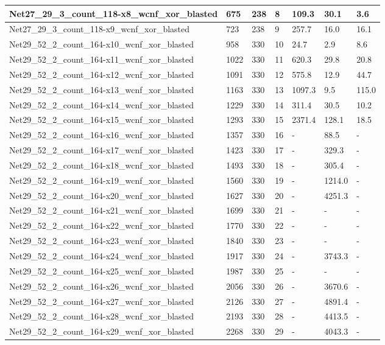 \begin{scriptsize}
\begin{longtable}{|p{5cm}|l|l|l|l|l|l|}
Net27\_29\_3\_count\_118-x8\_wcnf\_xor\_blasted&675&238&8&109.3&30.1&3.6 \\ \hline 
Net27\_29\_3\_count\_118-x9\_wcnf\_xor\_blasted&723&238&9&257.7&16.0&16.1 \\ \hline 
Net29\_52\_2\_count\_164-x10\_wcnf\_xor\_blasted&958&330&10&24.7&2.9&8.6 \\ \hline 
Net29\_52\_2\_count\_164-x11\_wcnf\_xor\_blasted&1022&330&11&620.3&29.8&20.8 \\ \hline 
Net29\_52\_2\_count\_164-x12\_wcnf\_xor\_blasted&1091&330&12&575.8&12.9&44.7 \\ \hline 
Net29\_52\_2\_count\_164-x13\_wcnf\_xor\_blasted&1163&330&13&1097.3&9.5&115.0 \\ \hline 
Net29\_52\_2\_count\_164-x14\_wcnf\_xor\_blasted&1229&330&14&311.4&30.5&10.2 \\ \hline 
Net29\_52\_2\_count\_164-x15\_wcnf\_xor\_blasted&1293&330&15&2371.4&128.1&18.5 \\ \hline 
Net29\_52\_2\_count\_164-x16\_wcnf\_xor\_blasted&1357&330&16&-&88.5&- \\ \hline 
Net29\_52\_2\_count\_164-x17\_wcnf\_xor\_blasted&1423&330&17&-&329.3&- \\ \hline 
Net29\_52\_2\_count\_164-x18\_wcnf\_xor\_blasted&1493&330&18&-&305.4&- \\ \hline 
Net29\_52\_2\_count\_164-x19\_wcnf\_xor\_blasted&1560&330&19&-&1214.0&- \\ \hline 
Net29\_52\_2\_count\_164-x20\_wcnf\_xor\_blasted&1627&330&20&-&4251.3&- \\ \hline 
Net29\_52\_2\_count\_164-x21\_wcnf\_xor\_blasted&1699&330&21&-&-&- \\ \hline 
Net29\_52\_2\_count\_164-x22\_wcnf\_xor\_blasted&1770&330&22&-&-&- \\ \hline 
Net29\_52\_2\_count\_164-x23\_wcnf\_xor\_blasted&1840&330&23&-&-&- \\ \hline 
Net29\_52\_2\_count\_164-x24\_wcnf\_xor\_blasted&1917&330&24&-&3743.3&- \\ \hline 
Net29\_52\_2\_count\_164-x25\_wcnf\_xor\_blasted&1987&330&25&-&-&- \\ \hline 
Net29\_52\_2\_count\_164-x26\_wcnf\_xor\_blasted&2056&330&26&-&3670.6&- \\ \hline 
Net29\_52\_2\_count\_164-x27\_wcnf\_xor\_blasted&2126&330&27&-&4891.4&- \\ \hline 
Net29\_52\_2\_count\_164-x28\_wcnf\_xor\_blasted&2193&330&28&-&4413.5&- \\ \hline 
Net29\_52\_2\_count\_164-x29\_wcnf\_xor\_blasted&2268&330&29&-&4043.3&- \\ \hline 

\end{longtable}
\end{scriptsize}
